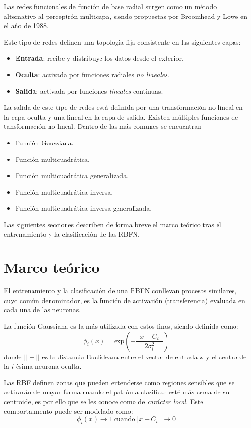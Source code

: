\documentclass[journal]{IEEEtran}
\begin{document}
Las redes funcionales de función de base radial surgen como un método alternativo al perceptrón multicapa, siendo propuestas por Broomhead y Lowe en el año de 1988.

Este tipo de redes definen una topología fija consistente en las siguientes capas:
\begin{itemize}
	\item \textbf{Entrada}: recibe y distribuye los datos desde el exterior.
	\item \textbf{Oculta}: activada por funciones radiales \emph{no lineales}.
	\item \textbf{Salida}: activada por funciones \emph{lineales} continuas.
\end{itemize}

La salida de este tipo de redes está definida por una transformación no lineal en la capa oculta y una lineal en la capa de salida.
Existen múltiples funciones de tansformación no lineal.
Dentro de las más comunes se encuentran
\begin{itemize}
	\item Función Gaussiana.
	\item Función multicuadrática.
	\item Función multicuadrática generalizada.
	\item Función multicuadrática inversa.
	\item Función multicuadrática inversa generalizada.
\end{itemize}

Las siguientes secciones describen de forma breve el marco teórico tras el entrenamiento y la clasificación de las RBFN.

\section{Marco teórico}
\label{sec:marco_teorico}
El entrenamiento y la clasificación de una RBFN conllevan procesos similares, cuyo común denominador, es la función de activación (transferencia) evaluada en cada una de las neuronas.

La función Gaussiana es la más utilizada con estos fines, siendo definida como:
$$
\phi_i (x) = \text{exp}(-\frac{||x-C_i||}{2\sigma_i^2})
$$
donde $||-||$ es la distancia Euclideana entre el vector de entrada $x$ y el centro de la $i$-ésima neurona oculta.

Las RBF definen zonas que pueden entenderse como regiones sensibles que se activarán de mayor forma cuando el patrón a clasificar esté más cerca de su centroide, es por ello que se les conoce como de \emph{carácter local}.
Este comportamiento puede ser modelado como:
$$
\phi _i (x) \rightarrow 1 ~\text{cuando} ||x-C_i||\rightarrow 0
$$
\end{document}
